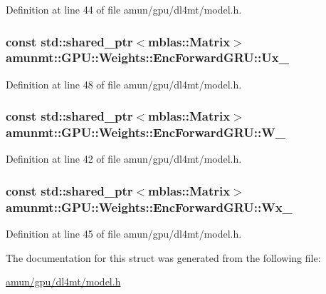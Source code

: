 Definition at line 44 of file amun/gpu/dl4mt/model.\+h.

\subsubsection[{\texorpdfstring{Ux\+\_\+}{Ux_}}]{\setlength{\rightskip}{0pt plus 5cm}const std\+::shared\+\_\+ptr$<${\bf mblas\+::\+Matrix}$>$ amunmt\+::\+G\+P\+U\+::\+Weights\+::\+Enc\+Forward\+G\+R\+U\+::\+Ux\+\_\+}\hypertarget{structamunmt_1_1GPU_1_1Weights_1_1EncForwardGRU_af5f1b632acc3f936dbf5154089a02f0a}{}\label{structamunmt_1_1GPU_1_1Weights_1_1EncForwardGRU_af5f1b632acc3f936dbf5154089a02f0a}


Definition at line 48 of file amun/gpu/dl4mt/model.\+h.

\subsubsection[{\texorpdfstring{W\+\_\+}{W_}}]{\setlength{\rightskip}{0pt plus 5cm}const std\+::shared\+\_\+ptr$<${\bf mblas\+::\+Matrix}$>$ amunmt\+::\+G\+P\+U\+::\+Weights\+::\+Enc\+Forward\+G\+R\+U\+::\+W\+\_\+}\hypertarget{structamunmt_1_1GPU_1_1Weights_1_1EncForwardGRU_a6d04c642b573f7d5a86e25ee9d640685}{}\label{structamunmt_1_1GPU_1_1Weights_1_1EncForwardGRU_a6d04c642b573f7d5a86e25ee9d640685}


Definition at line 42 of file amun/gpu/dl4mt/model.\+h.

\subsubsection[{\texorpdfstring{Wx\+\_\+}{Wx_}}]{\setlength{\rightskip}{0pt plus 5cm}const std\+::shared\+\_\+ptr$<${\bf mblas\+::\+Matrix}$>$ amunmt\+::\+G\+P\+U\+::\+Weights\+::\+Enc\+Forward\+G\+R\+U\+::\+Wx\+\_\+}\hypertarget{structamunmt_1_1GPU_1_1Weights_1_1EncForwardGRU_a9310f4c484c57c64a0294a3eb348c6ba}{}\label{structamunmt_1_1GPU_1_1Weights_1_1EncForwardGRU_a9310f4c484c57c64a0294a3eb348c6ba}


Definition at line 45 of file amun/gpu/dl4mt/model.\+h.



The documentation for this struct was generated from the following file\+:\begin{DoxyCompactItemize}
\item 
\hyperlink{amun_2gpu_2dl4mt_2model_8h}{amun/gpu/dl4mt/model.\+h}\end{DoxyCompactItemize}
